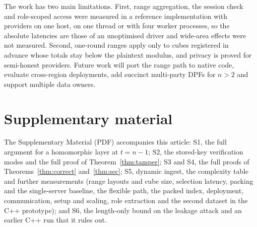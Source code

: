 The work has two main limitations. First, range aggregation, the session check
and role-scoped access were measured in a reference implementation with
providers on one host, on one thread or with four worker processes, so the
absolute latencies are those of an unoptimised driver and wide-area effects
were not measured. Second,
one-round ranges apply only to cubes registered in advance whose totals stay
below the plaintext modulus, and privacy is proved for semi-honest providers.
Future work will port the range path to native code, evaluate cross-region
deployments, add succinct multi-party DPFs for $n>2$ and support multiple data
owners.

\section*{Supplementary material}
The Supplementary Material (PDF) accompanies this article: S1, the full
argument for a homomorphic layer at $t=n-1$; S2, the stored-key verification
modes and the full proof of Theorem~\ref{thm:tamper}; S3 and S4, the full
proofs of Theorems~\ref{thm:correct} and~\ref{thm:sec}; S5, dynamic ingest, the
complexity table and further measurements (range layouts and cube size,
selection latency, packing and the single-server baseline, the flexible path,
the packed index, deployment, communication, setup and scaling, role
extraction and the second dataset in the C++ prototype); and S6, the
length-only bound on the leakage attack and an earlier C++ run that it rules
out.
